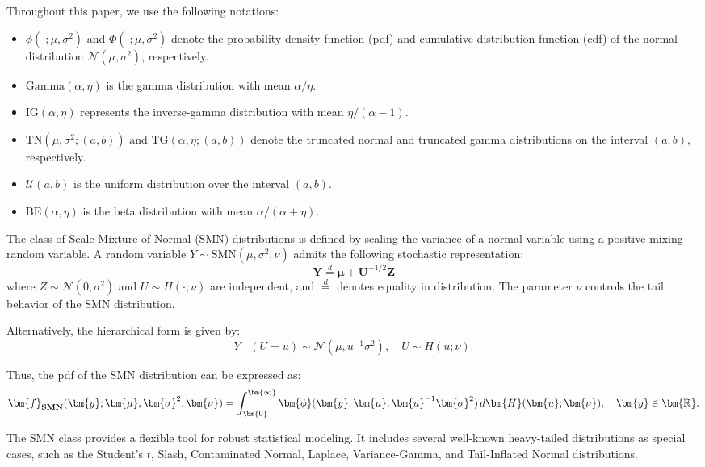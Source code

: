 \documentclass[10.5pt]{article} %
\begin{document}
Throughout this paper, we use the following notations:

\begin{itemize}
    \item $\phi(\cdot; \mu, \sigma^2)$ and $\Phi(\cdot; \mu, \sigma^2)$ denote the probability density function (pdf) and cumulative distribution function (cdf) of the normal distribution $\mathcal{N}(\mu, \sigma^2)$, respectively.
    \item $\text{Gamma}(\alpha, \eta)$ is the gamma distribution with mean $\alpha/\eta$.
    \item $\text{IG}(\alpha, \eta)$ represents the inverse-gamma distribution with mean $\eta/(\alpha - 1)$.
    \item $\text{TN}(\mu, \sigma^2; (a, b))$ and $\text{TG}(\alpha, \eta; (a, b))$ denote the truncated normal and truncated gamma distributions on the interval $(a, b)$, respectively.
    \item $\mathcal{U}(a, b)$ is the uniform distribution over the interval $(a, b)$.
    \item $\text{BE}(\alpha, \eta)$ is the beta distribution with mean $\alpha / (\alpha + \eta)$.
\end{itemize}

\noindent
The class of Scale Mixture of Normal (SMN) distributions is defined by scaling the variance of a normal variable using a positive mixing random variable. A random variable $Y \sim \text{SMN}(\mu, \sigma^2, \nu)$ admits the following stochastic representation:
\[
\bm{Y} \overset{d}{=} \bm{\mu} + \bm{U}^{-1/2} \bm{Z}
\]
where $Z \sim \mathcal{N}(0, \sigma^2)$ and $U \sim H(\cdot; \nu)$ are independent, and $\overset{d}{=}$ denotes equality in distribution. The parameter $\nu$ controls the tail behavior of the SMN distribution.

\noindent
Alternatively, the hierarchical form is given by:
\[
Y \mid (U = u) \sim \mathcal{N}(\mu, u^{-1}\sigma^2), \quad U \sim H(u; \nu).
\]

\noindent
Thus, the pdf of the SMN distribution can be expressed as:
\[
\bm{f}_{\text{\textbf{SMN}}}(\bm{y}; \bm{\mu}, \bm{\sigma}^2, \bm{\nu}) 
= \int_{\bm{0}}^{\bm{\infty}} \bm{\phi}(\bm{y}; \bm{\mu}, \bm{u}^{-1} \bm{\sigma}^2) \, d\bm{H}(\bm{u}; \bm{\nu}), 
\quad \bm{y} \in \bm{\mathbb{R}}.
\]

\noindent
The SMN class provides a flexible tool for robust statistical modeling. It includes several well-known heavy-tailed distributions as special cases, such as the Student's $t$, Slash, Contaminated Normal, Laplace, Variance-Gamma, and Tail-Inflated Normal distributions. 
\end{document}
